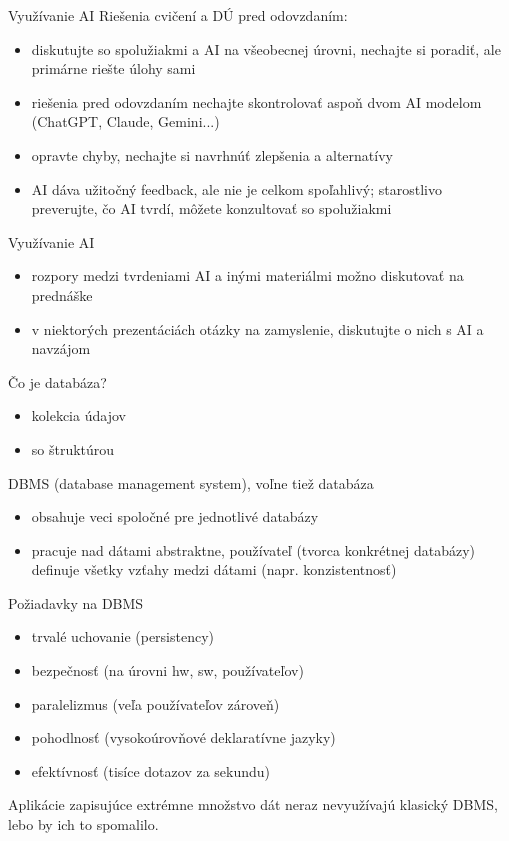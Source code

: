 \documentclass[12pt]{beamer}
\begin{document}
\begin{frame}{Využívanie AI}
Riešenia cvičení a DÚ pred odovzdaním:
\begin{itemize}
\item diskutujte so spolužiakmi a AI na všeobecnej úrovni, nechajte si poradiť, ale primárne riešte úlohy sami
\item riešenia pred odovzdaním nechajte skontrolovať aspoň dvom AI modelom (ChatGPT, Claude, Gemini...)
\item opravte chyby, nechajte si navrhnúť zlepšenia a alternatívy
\item AI dáva užitočný feedback, ale nie je celkom spoľahlivý; starostlivo preverujte, čo AI tvrdí, môžete konzultovať so spolužiakmi
\end{itemize}
\end{frame}

\begin{frame}{Využívanie AI}
\begin{itemize}
\item rozpory medzi tvrdeniami AI a inými materiálmi možno diskutovať na prednáške
\item v niektorých prezentáciách otázky na zamyslenie, diskutujte o nich s AI a navzájom
\end{itemize}
\end{frame}

\begin{frame}{Čo je databáza?}
\begin{itemize}
\item kolekcia údajov
\item so štruktúrou
\end{itemize}
\vskip 1cm
\pause
DBMS (database management system), voľne tiež databáza
\begin{itemize}
\item obsahuje veci spoločné pre jednotlivé databázy
\item pracuje nad dátami abstraktne, používateľ (tvorca konkrétnej databázy) definuje všetky vzťahy medzi dátami (napr. konzistentnosť)
\end{itemize}
\end{frame}

\begin{frame}{Požiadavky na DBMS}
\begin{itemize}
\item trvalé uchovanie (persistency)
\item bezpečnosť (na úrovni hw, sw, používateľov)
\item paralelizmus (veľa používateľov zároveň)
\item pohodlnosť (vysokoúrovňové deklaratívne jazyky)
\item efektívnosť (tisíce dotazov za sekundu)
\end{itemize}
\bigskip
\pause
Aplikácie zapisujúce extrémne množstvo dát neraz nevyužívajú klasický DBMS, lebo by ich to spomalilo.
\end{frame}
\end{document}
